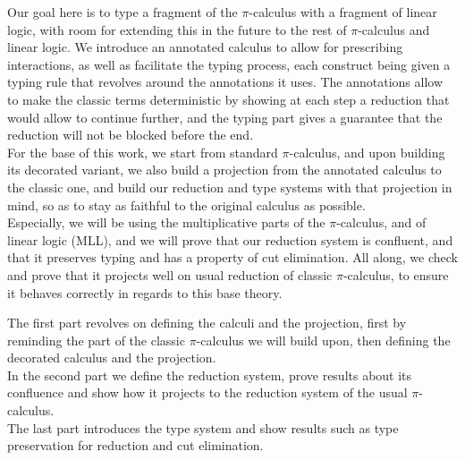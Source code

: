 Our goal here is to type a fragment of the $\pi$-calculus with a fragment of linear logic, with room for extending this in the future to the rest of $\pi$-calculus and linear logic. We introduce an annotated calculus to allow for prescribing interactions, as well as facilitate the typing process, each construct being given a typing rule that revolves around the annotations it uses. The annotations allow to make the classic terms deterministic by showing at each step a reduction that would allow to continue further, and the typing part gives a guarantee that the reduction will not be blocked before the end.\\
For the base of this work, we start from standard $\pi$-calculus, and upon building its decorated variant, we also build a projection from the annotated calculus to the classic one, and build our reduction and type systems with that projection in mind, so as to stay as faithful to the original calculus as possible.\\
Especially, we will be using the multiplicative parts of the $\pi$-calculus, and of linear logic (MLL), and we will prove that our reduction system is confluent, and that it preserves typing and has a property of cut elimination. All along, we check and prove that it projects well on usual reduction of classic $\pi$-calculus, to ensure it behaves correctly in regards to this base theory.\\

\bigskip

The first part revolves on defining the calculi and the projection, first by reminding the part of the classic $\pi$-calculus we will build upon, then defining the decorated calculus and the projection.\\
In the second part we define the reduction system, prove results about its confluence and show how it projects to the reduction system of the usual $\pi$-calculus.\\
The last part introduces the type system and show results such as type preservation for reduction and cut elimination.